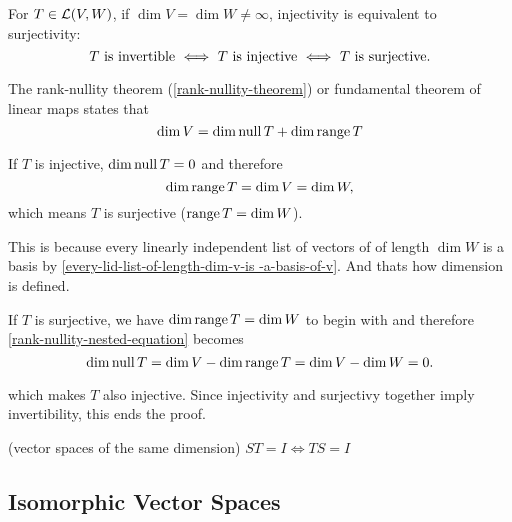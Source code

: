   \setcounter{thm}{64}
  \begin{thm} 
    \label{injectivity-is-equivalent-to-surjectivity}
    For $T\in \mathcal{L}(V,W)$, if $\dim V = \dim W \neq \infty$, injectivity is equivalent to surjectivity:
    \begin{equation}
        T$ is invertible $\iff$ $T$ is injective $\iff$ $T$ is surjective.$
    \end{equation}
  \end{thm}
  \begin{prf}
    The rank-nullity theorem (\ref{rank-nullity-theorem}) or fundamental theorem of linear maps states that
    \begin{equation}
      \label{rank-nullity-nested-equation}
      \dim V = \dim \operatorname{null} T + \dim \operatorname{range} T
    \end{equation}

    If $T$ is injective, $\dim \operatorname{null} T = 0$ and therefore 
    \begin{equation}
      \dim \operatorname{range} T = \dim V = \dim W,
    \end{equation} 
    which means $T$ is surjective ($\operatorname{range} T = \dim W$). 
    
    This is because every linearly independent list of vectors of of length $\dim W$ is a basis by \ref{every-lid-list-of-length-dim-v-is -a-basis-of-v}. And thats how dimension is defined.

    If $T$ is surjective, we have $\dim \operatorname{range} T = \dim W$ to begin with and therefore \ref{rank-nullity-nested-equation} becomes
    \begin{equation}
      \dim \operatorname{null} T = \dim V - \dim \operatorname{range} T = \dim V - \dim W = 0.
    \end{equation} 
    
    
    which makes $T$ also injective. 
    Since injectivity and surjectivy together imply invertibility, this ends the proof. 
  \end{prf}



  \setcounter{thm}{67}
  \begin{thm} (vector spaces of the same dimension)
    $ST = I \Leftrightarrow TS=I$
  \end{thm}

  \subsection{Isomorphic Vector Spaces}

